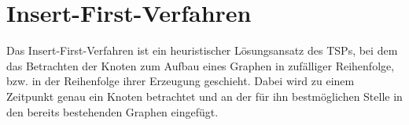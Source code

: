 \section{Insert-First-Verfahren} \label{sec:insert-first-verfahren}

Das Insert-First-Verfahren ist ein heuristischer Lösungsansatz des \ac{TSP}s, bei dem das Betrachten der Knoten zum Aufbau eines Graphen in zufälliger Reihenfolge, bzw. in der Reihenfolge ihrer Erzeugung geschieht.
Dabei wird zu einem Zeitpunkt genau ein Knoten betrachtet und an der für ihn bestmöglichen Stelle in den bereits bestehenden Graphen eingefügt.

